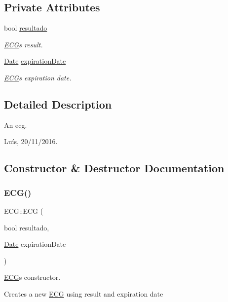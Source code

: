 \subsection*{Private Attributes}
\begin{DoxyCompactItemize}
\item 
bool \hyperlink{class_e_c_g_a29fc67e15b0e5ec13bd4feef93a59df0}{resultado}
\begin{DoxyCompactList}\small\item\em \hyperlink{class_e_c_g}{E\+CG}\textquotesingle{}s result. \end{DoxyCompactList}\item 
\hyperlink{class_date}{Date} \hyperlink{class_e_c_g_a5b4f40c0eb92a88ebc2817ff09dcced9}{expiration\+Date}
\begin{DoxyCompactList}\small\item\em \hyperlink{class_e_c_g}{E\+CG}\textquotesingle{}s expiration date. \end{DoxyCompactList}\end{DoxyCompactItemize}


\subsection{Detailed Description}
An ecg. 

Luís, 20/11/2016. 

\subsection{Constructor \& Destructor Documentation}
\hypertarget{class_e_c_g_a4405d7c131f1cfd7262444fe65062461}{}\label{class_e_c_g_a4405d7c131f1cfd7262444fe65062461} 
\subsubsection{\texorpdfstring{E\+C\+G()}{ECG()}}
{\footnotesize\ttfamily E\+C\+G\+::\+E\+CG (\begin{DoxyParamCaption}\item[{bool}]{resultado,  }\item[{\hyperlink{class_date}{Date}}]{expiration\+Date }\end{DoxyParamCaption})}



\hyperlink{class_e_c_g}{E\+CG}\textquotesingle{}s constructor. 

Creates a new \hyperlink{class_e_c_g}{E\+CG} using result and expiration date 


